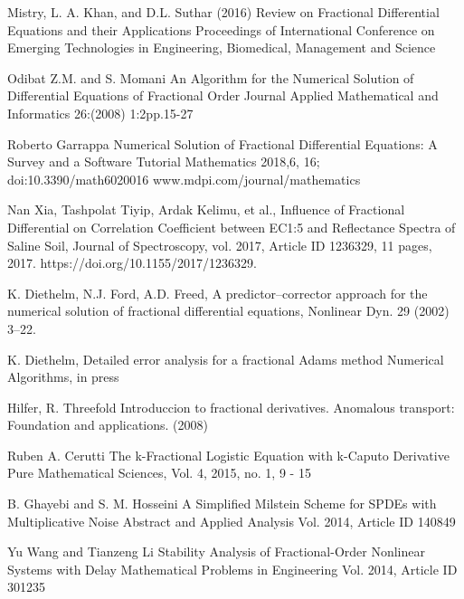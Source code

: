 
\begin{thebibliography}{00}

 Mistry, L. A. Khan, and D.L. Suthar (2016)
\newblock Review on Fractional Differential Equations and their Applications
\newblock Proceedings of International Conference on Emerging Technologies in Engineering, Biomedical, Management and Science 

 Odibat Z.M. and S. Momani
\newblock An Algorithm for the Numerical Solution of Differential Equations of Fractional Order
\newblock Journal Applied Mathematical and Informatics 26:(2008) 1:2pp.15-27

 Roberto Garrappa
\newblock Numerical Solution of Fractional Differential Equations: A Survey and a Software Tutorial
\newblock Mathematics 2018,6, 16; doi:10.3390/math6020016 www.mdpi.com/journal/mathematics

 Nan Xia, Tashpolat Tiyip, Ardak Kelimu, et al., 
\newblock Influence of Fractional Differential on Correlation Coefficient between EC1:5 and Reflectance Spectra of Saline Soil,
\newblock Journal of Spectroscopy, vol. 2017, Article ID 1236329, 11 pages, 2017. https://doi.org/10.1155/2017/1236329.

K. Diethelm, N.J. Ford, A.D. Freed, 
\newblock A predictor–corrector approach for the numerical solution of fractional differential equations, 
\newblock Nonlinear Dyn. 29 (2002) 3–22.
 
 K. Diethelm, 
\newblock Detailed error analysis for a fractional Adams method
\newblock Numerical Algorithms, in press

 Hilfer,  R.
\newblock Threefold  Introduccion  to  fractional  derivatives.  
\newblock Anomalous transport:  Foundation and applications. (2008)

 Ruben A. Cerutti
\newblock The k-Fractional Logistic Equation with k-Caputo Derivative
\newblock Pure Mathematical Sciences, Vol.  4, 2015, no.  1, 9 - 15

B. Ghayebi and S. M. Hosseini
\newblock A Simplified Milstein Scheme for SPDEs with Multiplicative Noise
\newblock Abstract and Applied Analysis Vol. 2014, Article ID 140849

Yu Wang and Tianzeng Li
\newblock Stability Analysis of Fractional-Order Nonlinear Systems with Delay
\newblock Mathematical Problems in Engineering Vol. 2014, Article ID 301235



\end{thebibliography}
